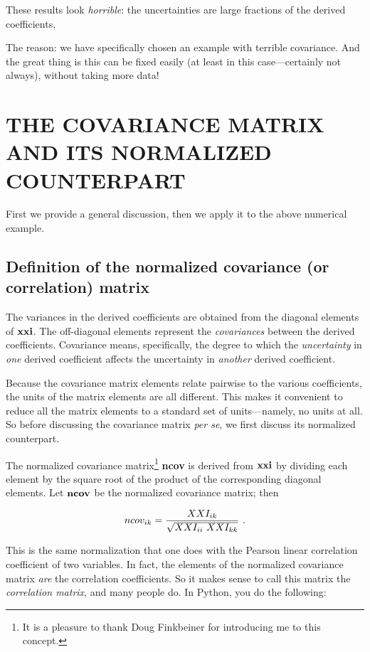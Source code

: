 \documentclass[psfig,preprint]{aastex}
\begin{document}
\noindent These results look {\it horrible}: the uncertainties are large
fractions of the derived coefficients, 

	The reason: we have specifically chosen an example with terrible
covariance. And the great thing is this can be fixed easily (at least in
this case---certainly not always), without taking more data! 

\section{THE COVARIANCE MATRIX AND ITS NORMALIZED COUNTERPART} 
\label{ncov}

	First we provide a general discussion, then we apply it to the
above numerical example.

\subsection{ Definition of the normalized covariance (or correlation) matrix}

	The variances in the derived coefficients are obtained from the
diagonal elements of ${\bf xxi}$. The off-diagonal elements represent
the {\it covariances} between the derived coefficients. Covariance
means, specifically, the degree to which the {\it uncertainty} in {\it
one} derived coefficient affects the uncertainty in {\it another}
derived coefficient. 

	Because the covariance matrix elements relate pairwise to the
various coefficients, the units of the matrix elements are all
different. This makes it convenient to reduce all the matrix elements to
a standard set of units---namely, no units at all. So before discussing
the covariance matrix {\it per se}, we first discuss its normalized
counterpart. 

	The normalized covariance
matrix\footnote{It is a pleasure to thank Doug Finkbeiner for
introducing me to this concept.} {\bf ncov} is derived from ${\bf xxi}$
by dividing each element by the square root of the product of the
corresponding diagonal elements. Let ${\bf ncov}$ be the normalized
covariance matrix; then

\begin{equation}
ncov_{ik} = {XXI_{ik} \over \sqrt {XXI_{ii} \ XXI_{kk}}} \ .
\end{equation}

\noindent This is the same normalization that one does with the Pearson
linear correlation coefficient of two variables.  In fact, the elements
of the normalized covariance matrix {\it are} the correlation
coefficients.  So it makes sense to call this matrix the {\it
correlation matrix}, and many people do. In Python, you do the following:
 
\end{document}
